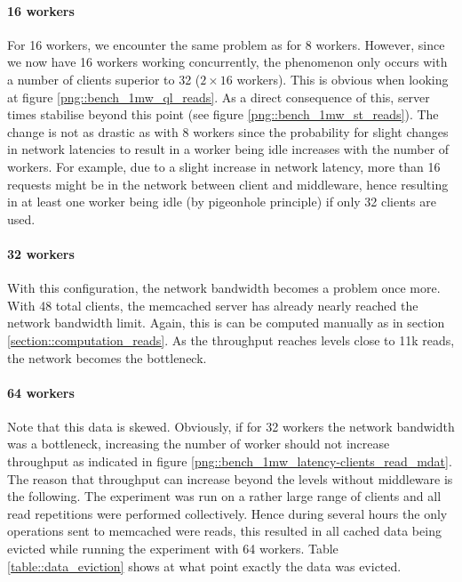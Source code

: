 \documentclass[11pt,a4paper]{article}
\begin{document}
\paragraph{16 workers}
For 16 workers, we encounter the same problem as for 8 workers. However, since we now have 16 workers working concurrently, the phenomenon only occurs with a number of clients superior to 32 ($2\times16$ workers). This is obvious when looking at figure \ref{png::bench_1mw_ql_reads}. As a direct consequence of this, server times stabilise beyond this point (see figure \ref{png::bench_1mw_st_reads}). The change is not as drastic as with 8 workers since the probability for slight changes in network latencies to result in a worker being idle increases with the number of workers. For example, due to a slight increase in network latency, more than 16 requests might be in the network between client and middleware, hence resulting in at least one worker being idle (by pigeonhole principle) if only 32 clients are used.

\paragraph{32 workers}
With this configuration, the network bandwidth becomes a problem once more. With 48 total clients, the memcached server has already nearly reached the network bandwidth limit. Again, this is can be computed manually as in section \ref{section::computation_reads}. As the throughput reaches levels close to 11k reads, the network becomes the bottleneck.

\paragraph{64 workers}
Note that this data is skewed. Obviously, if for 32 workers the network bandwidth was a bottleneck, increasing the number of worker should not increase throughput as indicated in figure \ref{png::bench_1mw_latency-clients_read_mdat}. The reason that throughput can increase beyond the levels without middleware is the following. The experiment was run on a rather large range of clients and all read repetitions were performed collectively. Hence during several hours the only operations sent to memcached were reads, this resulted in all cached data being evicted while running the experiment with 64 workers. Table \ref{table::data_eviction} shows at what point exactly the data was evicted.
\end{document}
